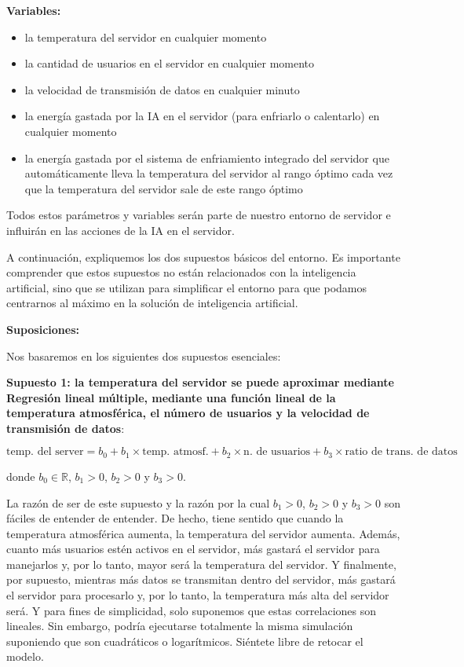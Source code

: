 \documentclass[
]{book}
\providecommand{\tightlist}{%
  \setlength{\itemsep}{0pt}\setlength{\parskip}{0pt}}
\begin{document}
\textbf{Variables:}

\begin{itemize}
\tightlist
\item
  la temperatura del servidor en cualquier momento
\item
  la cantidad de usuarios en el servidor en cualquier momento
\item
  la velocidad de transmisión de datos en cualquier minuto
\item
  la energía gastada por la IA en el servidor (para enfriarlo o calentarlo) en cualquier momento
\item
  la energía gastada por el sistema de enfriamiento integrado del servidor que automáticamente lleva la temperatura del servidor al rango óptimo cada vez que la temperatura del servidor sale de este rango óptimo
\end{itemize}

Todos estos parámetros y variables serán parte de nuestro entorno de servidor e influirán en las acciones de la IA en el servidor.

A continuación, expliquemos los dos supuestos básicos del entorno. Es importante comprender que estos supuestos no están relacionados con la inteligencia artificial, sino que se utilizan para simplificar el entorno para que podamos centrarnos al máximo en la solución de inteligencia artificial.

\textbf{Suposiciones:}

Nos basaremos en los siguientes dos supuestos esenciales:

\textbf{Supuesto 1: la temperatura del servidor se puede aproximar mediante Regresión lineal múltiple, mediante una función lineal de la temperatura atmosférica, el número de usuarios y la velocidad de transmisión de datos}:

\[\textrm{temp. del server} = b_0 + b_1 \times \textrm{temp. atmosf.} + b_2 \times \textrm{n. de usuarios} + b_3 \times \textrm{ratio de trans. de datos} \]

donde \(b_0 \in \mathbb{R}\), \(b_1>0\), \(b_2>0\) y \(b_3>0\).

La razón de ser de este supuesto y la razón por la cual \(b_1>0\), \(b_2>0\) y \(b_3>0\) son fáciles de entender de entender. De hecho, tiene sentido que cuando la temperatura atmosférica aumenta, la temperatura del servidor aumenta. Además, cuanto más usuarios estén activos en el servidor, más gastará el servidor para manejarlos y, por lo tanto, mayor será la temperatura del servidor. Y finalmente, por supuesto, mientras más datos se transmitan dentro del servidor, más gastará el servidor para procesarlo y, por lo tanto, la temperatura más alta del servidor será. Y para fines de simplicidad, solo suponemos que estas correlaciones son lineales. Sin embargo, podría ejecutarse totalmente la misma simulación suponiendo que son cuadráticos o logarítmicos. Siéntete libre de retocar el modelo.
\end{document}
